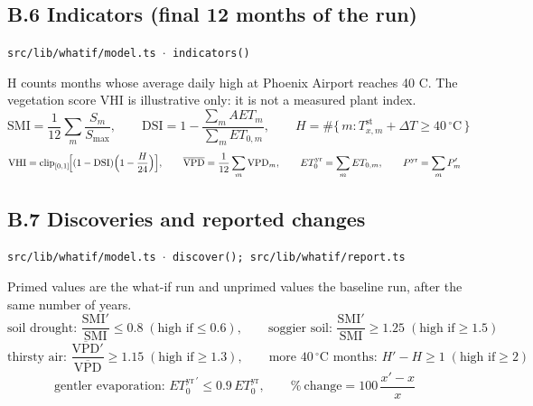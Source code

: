 \documentclass[10pt,a4paper]{article}
\begin{document}
\subsection*{B.6 Indicators (final 12 months of the run)}
{\footnotesize\texttt{src/lib/whatif/model.ts $\cdot$ indicators()}}

H counts months whose average daily high at Phoenix Airport reaches 40 \textdegree{}C. The vegetation score VHI is illustrative only: it is not a measured plant index.
\[
\mathrm{SMI} = \frac{1}{12}\sum_{m} \frac{S_m}{S_{\max}}, \qquad \mathrm{DSI} = 1 - \frac{\sum_m AET_m}{\sum_m ET_{0,m}}, \qquad H = \#\{\, m : T^{\text{st}}_{x,m} + \Delta T \ge 40\,^\circ\mathrm{C} \,\}
\]
\[
\mathrm{VHI} = \operatorname{clip}_{[0,1]}\!\Bigl[(1 - \mathrm{DSI})\Bigl(1 - \frac{H}{24}\Bigr)\Bigr], \qquad \overline{\mathrm{VPD}} = \frac{1}{12}\sum_m \mathrm{VPD}_m, \qquad ET_0^{\text{yr}} = \sum_m ET_{0,m}, \qquad P^{\text{yr}} = \sum_m P'_m
\]

\subsection*{B.7 Discoveries and reported changes}
{\footnotesize\texttt{src/lib/whatif/model.ts $\cdot$ discover(); src/lib/whatif/report.ts}}

Primed values are the what-if run and unprimed values the baseline run, after the same number of years.
\[
\text{soil drought: } \frac{\mathrm{SMI}'}{\mathrm{SMI}} \le 0.8 \;(\text{high if} \le 0.6), \qquad \text{soggier soil: } \frac{\mathrm{SMI}'}{\mathrm{SMI}} \ge 1.25 \;(\text{high if} \ge 1.5)
\]
\[
\text{thirsty air: } \frac{\overline{\mathrm{VPD}}'}{\overline{\mathrm{VPD}}} \ge 1.15 \;(\text{high if} \ge 1.3), \qquad \text{more } 40\,^\circ\mathrm{C} \text{ months: } H' - H \ge 1 \;(\text{high if} \ge 2)
\]
\[
\text{gentler evaporation: } ET_0^{\text{yr}\,\prime} \le 0.9\, ET_0^{\text{yr}}, \qquad \%\ \text{change} = 100\,\frac{x' - x}{x}
\]
\end{document}
